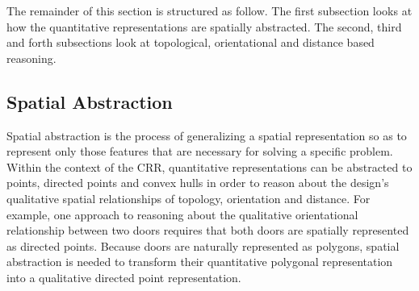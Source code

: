 \documentclass[12pt]{ucthesis}
\begin{document}

The remainder of this section is structured as follow. The first subsection looks at how the quantitative representations are spatially abstracted. The second, third and forth subsections look at topological, orientational and distance based reasoning.

\subsection{Spatial Abstraction}
Spatial abstraction is the process of generalizing a spatial representation so as to represent only those features that are necessary for solving a specific problem. Within the context of the CRR, quantitative representations can be abstracted to points, directed points and convex hulls in order to reason about the design's qualitative spatial relationships of topology, orientation and distance. For example, one approach to reasoning about the qualitative orientational relationship between two doors requires that both doors are spatially represented as directed points. Because doors are naturally represented as polygons, spatial abstraction is needed to transform their quantitative polygonal representation into a qualitative directed point representation.

\end{document}
